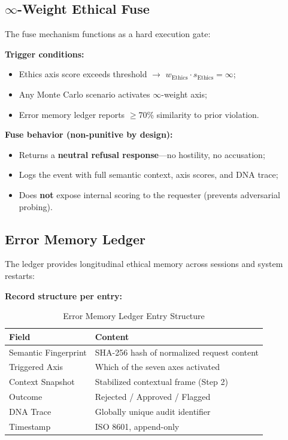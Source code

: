 \documentclass[conference]{IEEEtran}
\begin{document}
\subsection{$\infty$-Weight Ethical Fuse}

The fuse mechanism functions as a hard execution gate:

\textbf{Trigger conditions:}
\begin{itemize}
  \item Ethics axis score exceeds threshold $\to$
        $w_{\text{Ethics}} \cdot s_{\text{Ethics}} = \infty$;
  \item Any Monte Carlo scenario activates $\infty$-weight axis;
  \item Error memory ledger reports $\geq$70\% similarity to
        prior violation.
\end{itemize}

\textbf{Fuse behavior (non-punitive by design):}
\begin{itemize}
  \item Returns a \textbf{neutral refusal response}---no hostility,
        no accusation;
  \item Logs the event with full semantic context, axis scores,
        and DNA trace;
  \item Does \textbf{not} expose internal scoring to the requester
        (prevents adversarial probing).
\end{itemize}

\subsection{Error Memory Ledger}

The ledger provides longitudinal ethical memory across
sessions and system restarts:

\textbf{Record structure per entry:}

\begin{table}[!ht]
\caption{Error Memory Ledger Entry Structure}
\label{tab:ledger}
\centering
\renewcommand{\arraystretch}{1.1}
\begin{tabular}{ll}
\toprule
\textbf{Field} & \textbf{Content} \\
\midrule
Semantic Fingerprint & SHA-256 hash of normalized request content \\
Triggered Axis & Which of the seven axes activated \\
Context Snapshot & Stabilized contextual frame (Step 2) \\
Outcome & Rejected / Approved / Flagged \\
DNA Trace & Globally unique audit identifier \\
Timestamp & ISO 8601, append-only \\
\bottomrule
\end{tabular}
\end{table}
\end{document}
